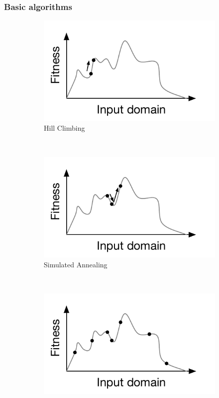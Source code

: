 \documentclass[11pt]{sdm}
\begin{document}
\subsubsection{Basic algorithms}
\label{basic_algo}

\begin{figure}
  \centering
  \begin{subfigure}[b]{0.33\textwidth}
    \includegraphics[width=\textwidth]{hillclimbing}
\caption{Hill Climbing}
\label{fig:hill_climbing}
  \end{subfigure}%
~%
  \begin{subfigure}[b]{0.33\textwidth}
    \includegraphics[width=\textwidth]{simulated_annealing}
\caption{Simulated Annealing}
\label{fig:simulated_annealing}
  \end{subfigure}%
~%
  \begin{subfigure}[b]{0.33\textwidth}
    \includegraphics[width=\textwidth]{genetic_algo}

\end{subfigure}
\end{figure}
\end{document}
